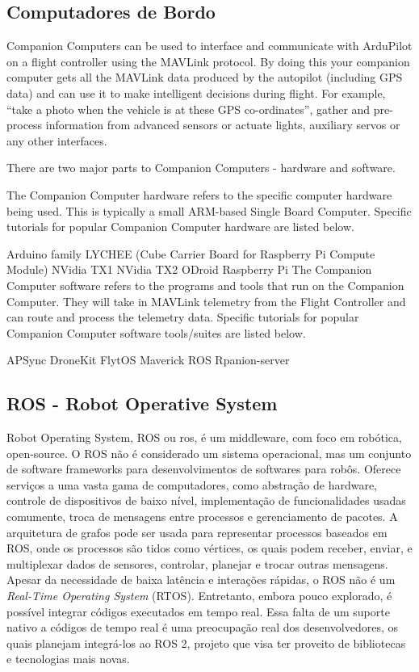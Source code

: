 \documentclass[12pt,a4paper,oneside]{book}
\begin{document}
\subsection{Computadores de Bordo}

Companion Computers can be used to interface and communicate with ArduPilot on a flight controller using the MAVLink protocol. By doing this your companion computer gets all the MAVLink data produced by the autopilot (including GPS data) and can use it to make intelligent decisions during flight. For example, “take a photo when the vehicle is at these GPS co-ordinates”, gather and pre-process information from advanced sensors or actuate lights, auxiliary servos or any other interfaces.

There are two major parts to Companion Computers - hardware and software.

The Companion Computer hardware refers to the specific computer hardware being used. This is typically a small ARM-based Single Board Computer. Specific tutorials for popular Companion Computer hardware are listed below.

Arduino family
LYCHEE (Cube Carrier Board for Raspberry Pi Compute Module)
NVidia TX1
NVidia TX2
ODroid
Raspberry Pi
The Companion Computer software refers to the programs and tools that run on the Companion Computer. They will take in MAVLink telemetry from the Flight Controller and can route and process the telemetry data. Specific tutorials for popular Companion Computer software tools/suites are listed below.

APSync
DroneKit
FlytOS
Maverick
ROS
Rpanion-server

\subsection{ROS - Robot Operative System}

Robot Operating System, ROS ou ros, é um middleware, 
com foco em robótica, open-source. O ROS não é considerado 
um sistema operacional, mas um conjunto de software 
frameworks para desenvolvimentos de softwares para robôs. 
Oferece serviços a uma vasta gama de computadores, 
como abstração de hardware, controle de dispositivos 
de baixo nível, implementação de funcionalidades usadas 
comumente, troca de mensagens entre processos e 
gerenciamento de pacotes. A arquitetura de grafos 
pode ser usada para representar processos baseados 
em ROS, onde os processos são tidos como vértices, 
os quais podem receber, enviar, e multiplexar 
dados de sensores, controlar, planejar e trocar 
outras mensagens. Apesar da necessidade de baixa latência
e interações rápidas, o ROS não é um \textit{Real-Time
Operating System} (RTOS). Entretanto, embora pouco explorado,
é possível integrar códigos executados em tempo real.
Essa falta de um suporte nativo a códigos de tempo real é
uma preocupação real dos desenvolvedores, os quais planejam 
integrá-los ao ROS 2, projeto que visa ter proveito de 
bibliotecas e tecnologias mais novas. 
\end{document}
